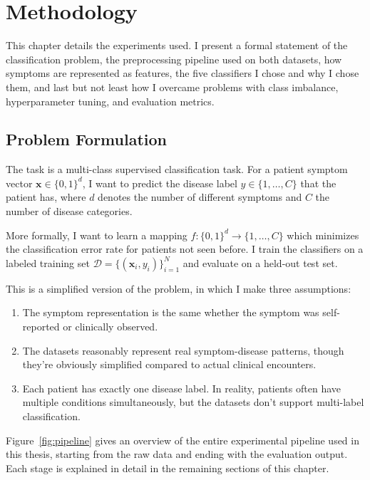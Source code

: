 \chapter{Methodology}
\label{ch:methodology}

This chapter details the experiments used. I present a formal statement of the classification problem, the preprocessing pipeline used on both datasets, how symptoms are represented as features, the five classifiers I chose and why I chose them, and last but not least how I overcame problems with class imbalance, hyperparameter tuning, and evaluation metrics.

\section{Problem Formulation}
\label{sec:problem_formulation}

The task is a multi-class supervised classification task. For a patient symptom vector $\mathbf{x} \in \{0, 1\}^d$, I want to predict the disease label $y \in \{1, \ldots, C\}$ that the patient has, where $d$ denotes the number of different symptoms and $C$ the number of disease categories.

More formally, I want to learn a mapping $f: \{0, 1\}^d \rightarrow \{1, \ldots, C\}$ which minimizes the classification error rate for patients not seen before. I train the classifiers on a labeled training set $\mathcal{D} = \{(\mathbf{x}_i, y_i)\}_{i=1}^{N}$ and evaluate on a held-out test set.

This is a simplified version of the problem, in which I make three assumptions:
\begin{enumerate}
    \item The symptom representation is the same whether the symptom was self-reported or clinically observed.
    \item The datasets reasonably represent real symptom-disease patterns, though they're obviously simplified compared to actual clinical encounters.
    \item Each patient has exactly one disease label. In reality, patients often have multiple conditions simultaneously, but the datasets don't support multi-label classification.
\end{enumerate}

Figure~\ref{fig:pipeline} gives an overview of the entire experimental pipeline used in this thesis, starting from the raw data and ending with the evaluation output. Each stage is explained in detail in the remaining sections of this chapter.

